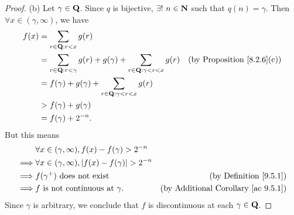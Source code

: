 \begin{proof}{(b)}
    Let \(\gamma \in \mathbf{Q}\).
    Since \(q\) is bijective, \(\exists!\ n \in \mathbf{N}\) such that \(q(n) = \gamma\).
    Then \(\forall x \in (\gamma, \infty)\), we have
    \begin{align*}
        f(x) & = \sum_{r \in \mathbf{Q} : r < x} g(r)                                                                                                   \\
             & = \sum_{r \in \mathbf{Q} : r < \gamma} g(r) + g(\gamma) + \sum_{r \in \mathbf{Q} : \gamma < r < x} g(r) & \text{(by Proposition \ref{8.2.6}(c))} \\
             & = f(\gamma) + g(\gamma) + \sum_{r \in \mathbf{Q} : \gamma < r < x} g(r)                                                                  \\
             & > f(\gamma) + g(\gamma)                                                                                                          \\
             & = f(\gamma) + 2^{-n}.
    \end{align*}
    But this means
    \begin{align*}
                 & \forall x \in (\gamma, \infty), f(x) - f(\gamma) > 2^{-n}                                                         \\
        \implies & \forall x \in (\gamma, \infty), \left\lvert f(x) - f(\gamma)\right\rvert > 2^{-n}                                                   \\
        \implies & f(\gamma^+) \text{ does not exist}                              & \text{(by Definition \ref{9.5.1})}              \\
        \implies & f \text{ is not continuous at } \gamma.                         & \text{(by Additional Corollary \ref{ac 9.5.1})}
    \end{align*}
    Since \(\gamma\) is arbitrary, we conclude that \(f\) is discontinuous at each \(\gamma \in \mathbf{Q}\).
\end{proof}

